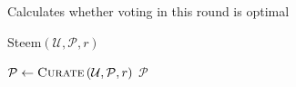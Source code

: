     \begin{algorithm}[H]
      \caption{Calculates whether voting in this round is optimal}
      \label{alg:isvoteround}
      \begin{algorithmic}[1]
          \State 
        \EndFunction
      \end{algorithmic}
    \end{algorithm}

    \begin{algorithm}[H]
      \caption{Steem$\left(\mathcal{U}, \mathcal{P}, r\right)$}
      \label{alg:main}
      \begin{algorithmic}[1]
      \State $\mathcal{P} \leftarrow \textsc{Curate}\left(\mathcal{U},
      \mathcal{P}, r\right)$
      \State \Return $\mathcal{P}$
      \end{algorithmic}
    \end{algorithm}
